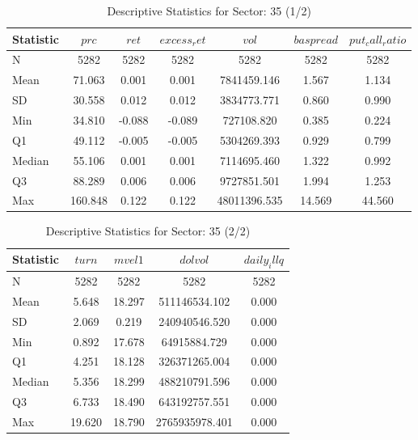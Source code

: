     \begin{table}[H]
    \centering

    
    \caption{Descriptive Statistics for Sector: 35 (1/2)}
    \label{tab:sec35_a}
    
    \begin{tabular}{lcccccc}
    \toprule
    Statistic & $prc$ & $ret$ & $excess_ret$ & $vol$ & $baspread$ & $put_call_ratio$ \\\midrule
    N & 5282 & 5282 & 5282 & 5282 & 5282 & 5282 \\
    Mean & 71.063 & 0.001 & 0.001 & 7841459.146 & 1.567 & 1.134 \\
    SD & 30.558 & 0.012 & 0.012 & 3834773.771 & 0.860 & 0.990 \\
    Min & 34.810 & -0.088 & -0.089 & 727108.820 & 0.385 & 0.224 \\
    Q1 & 49.112 & -0.005 & -0.005 & 5304269.393 & 0.929 & 0.799 \\
    Median & 55.106 & 0.001 & 0.001 & 7114695.460 & 1.322 & 0.992 \\
    Q3 & 88.289 & 0.006 & 0.006 & 9727851.501 & 1.994 & 1.253 \\
    Max & 160.848 & 0.122 & 0.122 & 48011396.535 & 14.569 & 44.560 \\
    \bottomrule
    \end{tabular}

    \end{table}
    
    \begin{table}[H]
    \centering

    
    \caption{Descriptive Statistics for Sector: 35 (2/2)}
    \label{tab:sec35_b}
    
    \begin{tabular}{lcccc}
    \toprule
    Statistic & $turn$ & $mvel1$ & $dolvol$ & $daily_illq$ \\\midrule
    N & 5282 & 5282 & 5282 & 5282 \\
    Mean & 5.648 & 18.297 & 511146534.102 & 0.000 \\
    SD & 2.069 & 0.219 & 240940546.520 & 0.000 \\
    Min & 0.892 & 17.678 & 64915884.729 & 0.000 \\
    Q1 & 4.251 & 18.128 & 326371265.004 & 0.000 \\
    Median & 5.356 & 18.299 & 488210791.596 & 0.000 \\
    Q3 & 6.733 & 18.490 & 643192757.551 & 0.000 \\
    Max & 19.620 & 18.790 & 2765935978.401 & 0.000 \\
    \bottomrule
    \end{tabular}

    \end{table}
    
